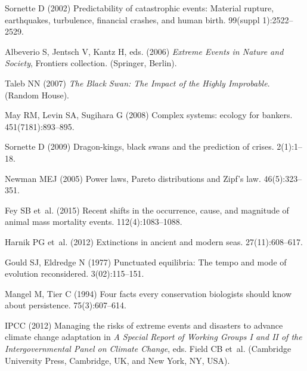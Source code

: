 \documentclass[9pt,twocolumn,twoside]{pnas-new}
\begin{document}
\showacknow %

\pnasbreak

% 
\begin{thebibliography}{10}

Sornette D (2002) Predictability of catastrophic events: Material rupture,
  earthquakes, turbulence, financial crashes, and human birth.
 99(suppl 1):2522--2529.

Albeverio S, Jentsch V, Kantz H, eds. (2006) {\em Extreme Events in Nature and
  Society}, Frontiers collection.
\newblock (Springer, Berlin).

Taleb NN (2007) {\em The Black Swan: The Impact of the Highly Improbable}.
\newblock (Random House).

May RM, Levin SA, Sugihara G (2008) Complex systems: ecology for bankers.
 451(7181):893--895.

Sornette D (2009) Dragon-kings, black swans and the prediction of crises.
  2(1):1--18.

Newman MEJ (2005) Power laws, {Pareto} distributions and {Zipf}'s law.
 46(5):323--351.

Fey SB et~al. (2015) Recent shifts in the occurrence, cause, and magnitude of
  animal mass mortality events.
 112(4):1083--1088.

Harnik PG et~al. (2012) Extinctions in ancient and modern seas.
 27(11):608--617.

Gould SJ, Eldredge N (1977) Punctuated equilibria: The tempo and mode of
  evolution reconsidered.
 3(02):115--151.

Mangel M, Tier C (1994) Four facts every conservation biologists should know
  about persistence.
 75(3):607--614.

{IPCC} (2012) Managing the risks of extreme events and disasters to advance
  climate change adaptation in {\em A Special Report of Working Groups I and II
  of the Intergovernmental Panel on Climate Change}, eds.{} Field CB et~al.
\newblock (Cambridge University Press, Cambridge, UK, and New York, NY, USA).


\end{thebibliography}
\end{document}
